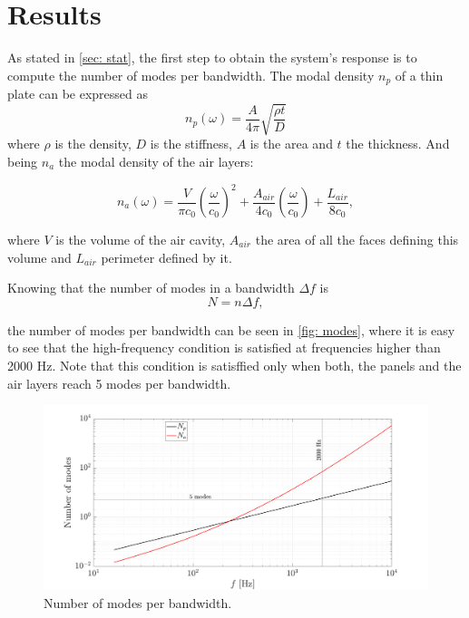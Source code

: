 \section{Results} \label{sec: res}

 As stated in \autoref{sec: stat}, the first step to obtain the system's response is to compute the number of modes per bandwidth. The modal density $n_p$ of a thin plate can be expressed as
 \begin{equation}
 n_p(\omega)=\frac{A}{4\pi}\sqrt{\frac{\rho t }{D}}
 \end{equation}
 where $\rho$ is the density, $D$ is the stiffness, $A$ is the area and $t$ the thickness. And being $n_a$ the modal density of the air layers:
 
 \begin{equation}
n_a(\omega)=\frac{V}{\pi c_0} \left(\frac{\omega}{c_0}\right)^2+\frac{A_{air}}{4 c_0}\left(\frac{\omega}{c_0}\right)+\frac{L_{air}}{8 c_0},
\end{equation}  

where $V$ is the volume of the air cavity, $A_{air}$ the area of all the faces defining this volume and $L_{air}$ perimeter defined by it.

Knowing that the number of modes in a bandwidth $\Delta f$ is 
\begin{equation}
N=n\Delta f ,
\end{equation}

the number of modes per bandwidth can be seen in \autoref{fig: modes}, where it  is easy to see that the high-frequency condition is satisfied at frequencies higher than 2000 Hz. Note that this condition is satisffied only when both, the panels and the air layers reach 5 modes per bandwidth.

\begin{figure}[H]
    \centering
    \includegraphics[width=0.9\linewidth]{Figures/modes.png}
    \caption{Number of modes per bandwidth.}
    \label{fig: modes}
\end{figure}

